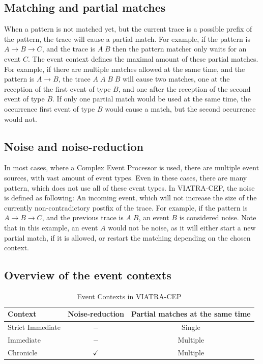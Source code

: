 \subsection{Matching and partial matches}
When a pattern is not matched yet, but the current trace is a possible prefix of the pattern, the trace will cause a partial match.
For example, if the pattern is $A \rightarrow B \rightarrow C$, and the trace is $A\;B$ then the pattern matcher only waits for an event $C$.
The event context defines the maximal amount of these partial matches.
For example, if there are multiple matches allowed at the same time, and the pattern is $A \rightarrow B$, the trace $A\;A\;B\;B$ will cause two matches, one at the reception of the first event of type $B$, and one after the reception of the second event of type $B$. 
If only one partial match would be used at the same time, the occurrence  first event of type $B$ would cause a match, but the second occurrence  would not.


\subsection{Noise and noise-reduction}
In most cases, where a Complex Event Processor is used, there are multiple event sources, with vast amount of event types.
Even in these cases, there are many pattern, which does not use all of these event types.
In VIATRA-CEP, the noise is defined as following: An incoming event, which will not increase the size of the currently non-contradictory postfix of the trace.
For example, if the pattern is $A \rightarrow B \rightarrow C$, and the previous trace is $A\;B$, an event $B$ is considered noise. Note that in this example, an event $A$ would not be noise, as it will either start a new partial match, if it is allowed, or restart the matching depending on the chosen context.

\subsection{Overview of the event contexts}

\begin{table}
	\caption{Event Contexts in VIATRA-CEP}		
	\label{tab:cep:contexts}
	\begin{tabularx}{\textwidth}{lcc}
		\toprule
		Context & Noise-reduction & Partial matches at the same time \\
		\midrule
		Strict Immediate & $-$ & Single \\
		Immediate & $-$ & Multiple \\
		Chronicle & $\checkmark$ & Multiple \\
		\bottomrule
	\end{tabularx}
\end{table}

